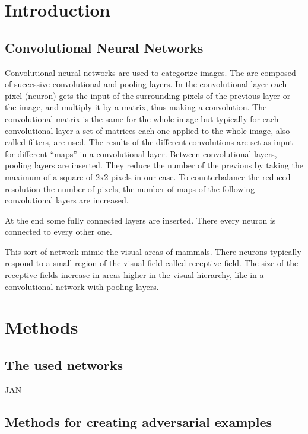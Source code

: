 \documentclass[%
 reprint,
 amsmath,amssymb,
 aps,
]{revtex4-1}
\begin{document}

\section{Introduction}


\subsection{Convolutional Neural Networks}

Convolutional neural networks are used to categorize images. The are composed of successive convolutional and pooling layers. In the convolutional layer each pixel (neuron) gets the input of the surrounding pixels of the previous layer or the image, and multiply it by a matrix, thus making a convolution. The convolutional matrix is the same for the whole image but typically for each convolutional layer a set of matrices each one applied to the whole image, also called filters, are used. The results of the different convolutions are set as input for different ``maps'' in a convolutional layer. Between convolutional layers, pooling layers are inserted. They reduce the number of the previous by taking the maximum of a square of 2x2 pixels in our case. To counterbalance the reduced resolution the number of pixels, the number of maps of the following convolutional layers are increased.

At the end some fully connected layers are inserted. There every neuron is connected to every other one.

This sort of network mimic the visual areas of mammals. There neurons typically respond to a small region of the visual field called receptive field. The size of the receptive fields increase in areas higher in the visual hierarchy, like in a convolutional network with pooling layers.

\section{Methods}

\subsection{The used networks}

JAN

\subsection{Methods for creating adversarial examples}
\end{document}
